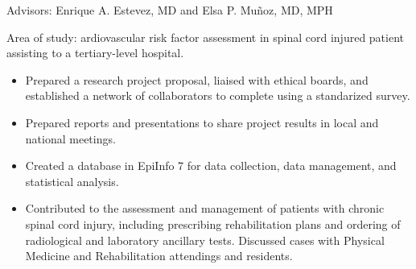 \begin{cventries}
{\begin{cvitems}
    \item {Advisors: Enrique A. Estevez, MD and Elsa P. Muñoz, MD, MPH}
    \item {Area of study: ardiovascular risk factor assessment in spinal cord injured patient assisting to a tertiary-level
    hospital.}
    \begin{itemize}
      \item {Prepared a research project proposal, liaised with ethical boards, and established a network of collaborators to complete using a standarized survey.}
      \item {Prepared reports and presentations to share project results in local and national meetings.}
      \item {Created a database in EpiInfo 7 for data collection, data management, and statistical analysis.}
      \item {Contributed to the assessment and management of patients with chronic spinal cord injury, including prescribing rehabilitation plans and ordering of radiological and laboratory ancillary tests. Discussed cases with Physical Medicine and Rehabilitation attendings and residents.}
    \end{itemize}
  \end{cvitems}
  }
  \vspace{5pt}
 



\end{cventries}
